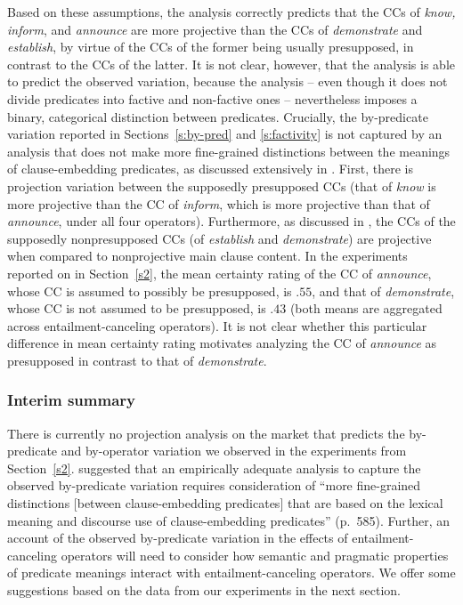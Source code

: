 \documentclass[a4paper,12pt,twoside]{article}
\begin{document}
    Based on these assumptions, the analysis correctly predicts that the CCs of \emph{know, inform}, and \emph{announce} are more projective than the CCs of \emph{demonstrate} and \emph{establish}, by virtue of the CCs of the former being usually presupposed, in contrast to the CCs of the latter. It is not clear, however, that the analysis is able to predict the observed variation, because the analysis -- even  though it does not divide predicates into factive and non-factive ones -- nevertheless imposes a binary, categorical distinction between predicates.
    Crucially, the by-predicate variation reported in Sections~\ref{s:by-pred} and \ref{s:factivity} is not captured by an analysis that does not make more fine-grained distinctions between the meanings of clause-embedding predicates, as discussed extensively in \citealt{degen_are_2022}. First, there is projection variation between the supposedly presupposed CCs (that of \emph{know} is more projective than the CC of \emph{inform}, which is more projective than that of \emph{announce}, under all four operators).
    Furthermore, as discussed in \citealt{degen_are_2022}, the CCs of the supposedly nonpresupposed CCs (of \emph{establish} and \emph{demonstrate}) are projective when compared to nonprojective main clause content. In the experiments reported on in Section~\ref{s2}, the mean certainty rating of the CC of \emph{announce}, whose CC is assumed to possibly be presupposed, is $.55$, and that of {\em demonstrate}, whose CC is not assumed to be presupposed, is $.43$ (both means are aggregated across entailment-canceling operators). It is not clear whether this particular difference in mean certainty rating motivates analyzing the CC of \emph{announce} as presupposed in contrast to that of \emph{demonstrate}.

\subsubsection{Interim summary}

    There is currently no projection analysis on the market that predicts the by-predicate and by-operator variation we observed in the experiments from Section~\ref{s2}. \citealt{degen_are_2022} suggested that an empirically adequate analysis to capture the observed by-predicate variation requires consideration of ``more fine-grained distinctions [between clause-embedding predicates] that are based on the lexical meaning and discourse use of clause-embedding predicates'' (p.~585). Further, an account of the observed by-predicate variation in the effects of entailment-canceling operators will need to consider how semantic and pragmatic properties of predicate meanings interact with entailment-canceling operators. We offer some suggestions based on the data from our experiments in the next section.  
\end{document}
